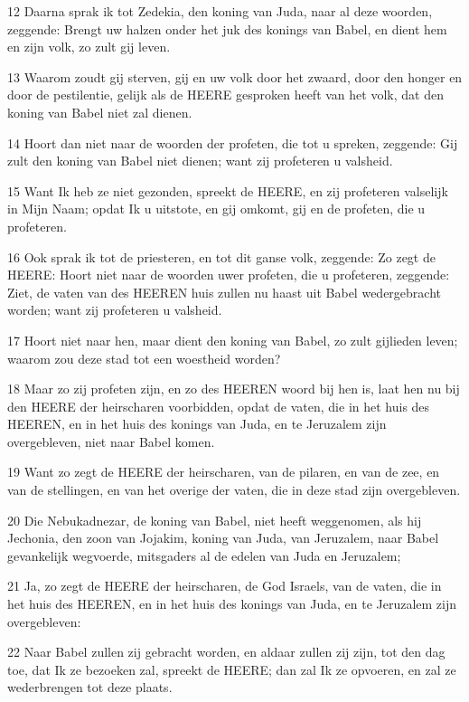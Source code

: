 \par 12 Daarna sprak ik tot Zedekia, den koning van Juda, naar al deze woorden, zeggende: Brengt uw halzen onder het juk des konings van Babel, en dient hem en zijn volk, zo zult gij leven.
\par 13 Waarom zoudt gij sterven, gij en uw volk door het zwaard, door den honger en door de pestilentie, gelijk als de HEERE gesproken heeft van het volk, dat den koning van Babel niet zal dienen.
\par 14 Hoort dan niet naar de woorden der profeten, die tot u spreken, zeggende: Gij zult den koning van Babel niet dienen; want zij profeteren u valsheid.
\par 15 Want Ik heb ze niet gezonden, spreekt de HEERE, en zij profeteren valselijk in Mijn Naam; opdat Ik u uitstote, en gij omkomt, gij en de profeten, die u profeteren.
\par 16 Ook sprak ik tot de priesteren, en tot dit ganse volk, zeggende: Zo zegt de HEERE: Hoort niet naar de woorden uwer profeten, die u profeteren, zeggende: Ziet, de vaten van des HEEREN huis zullen nu haast uit Babel wedergebracht worden; want zij profeteren u valsheid.
\par 17 Hoort niet naar hen, maar dient den koning van Babel, zo zult gijlieden leven; waarom zou deze stad tot een woestheid worden?
\par 18 Maar zo zij profeten zijn, en zo des HEEREN woord bij hen is, laat hen nu bij den HEERE der heirscharen voorbidden, opdat de vaten, die in het huis des HEEREN, en in het huis des konings van Juda, en te Jeruzalem zijn overgebleven, niet naar Babel komen.
\par 19 Want zo zegt de HEERE der heirscharen, van de pilaren, en van de zee, en van de stellingen, en van het overige der vaten, die in deze stad zijn overgebleven.
\par 20 Die Nebukadnezar, de koning van Babel, niet heeft weggenomen, als hij Jechonia, den zoon van Jojakim, koning van Juda, van Jeruzalem, naar Babel gevankelijk wegvoerde, mitsgaders al de edelen van Juda en Jeruzalem;
\par 21 Ja, zo zegt de HEERE der heirscharen, de God Israels, van de vaten, die in het huis des HEEREN, en in het huis des konings van Juda, en te Jeruzalem zijn overgebleven:
\par 22 Naar Babel zullen zij gebracht worden, en aldaar zullen zij zijn, tot den dag toe, dat Ik ze bezoeken zal, spreekt de HEERE; dan zal Ik ze opvoeren, en zal ze wederbrengen tot deze plaats.

